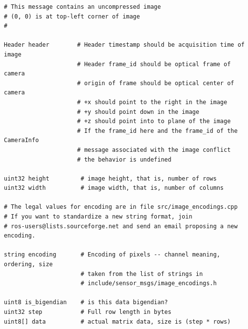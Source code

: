 \begin{lstlisting}[caption=Definizione del messaggio \emph{sensor\_msgs/Image}.]
# This message contains an uncompressed image
# (0, 0) is at top-left corner of image
#

Header header        # Header timestamp should be acquisition time of image
                     # Header frame_id should be optical frame of camera
                     # origin of frame should be optical center of camera
                     # +x should point to the right in the image
                     # +y should point down in the image
                     # +z should point into to plane of the image
                     # If the frame_id here and the frame_id of the CameraInfo
                     # message associated with the image conflict
                     # the behavior is undefined

uint32 height         # image height, that is, number of rows
uint32 width          # image width, that is, number of columns

# The legal values for encoding are in file src/image_encodings.cpp
# If you want to standardize a new string format, join
# ros-users@lists.sourceforge.net and send an email proposing a new encoding.

string encoding       # Encoding of pixels -- channel meaning, ordering, size
                      # taken from the list of strings in
                      # include/sensor_msgs/image_encodings.h

uint8 is_bigendian    # is this data bigendian?
uint32 step           # Full row length in bytes
uint8[] data          # actual matrix data, size is (step * rows)
\end{lstlisting}
\newpage

\indent

\indent

\indent

\indent

\indent
